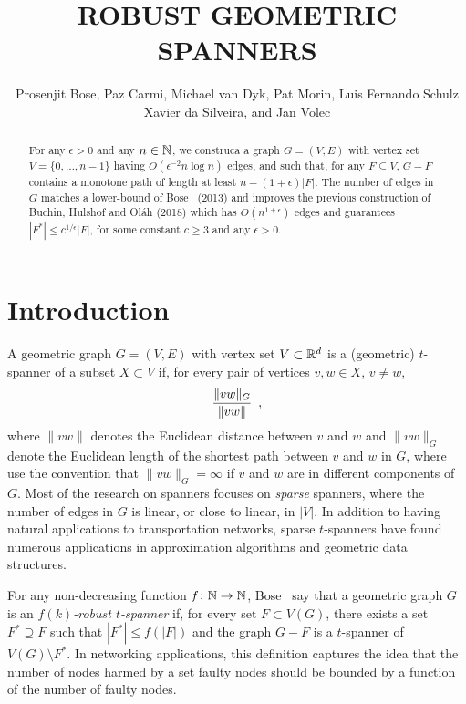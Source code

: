 \documentclass{patmorin}
\title{\MakeUppercase{Robust Geometric Spanners}}
\author{Prosenjit Bose, Paz Carmi, Michael van Dyk, Pat Morin, 
  \newline
  Luis Fernando Schulz Xavier da Silveira,
  and Jan Volec}
\begin{document}
\maketitle


\begin{abstract}
  For any $\epsilon >0$ and any $n\in\mathbb{N}$, we construca a graph $G=(V,E)$
  with vertex set $V=\{0,\ldots,n-1\}$ having $O(\epsilon^{-2}n\log n)$
  edges, and such that, for any $F\subseteq V$, $G-F$ contains a monotone
  path of length at least $n-(1+\epsilon)|F|$.  The number of edges
  in $G$ matches a lower-bound of Bose \etal\ (2013) and improves the
  previous construction of Buchin, Hulshof and Ol\'ah (2018) which has
  $O(n^{1+\epsilon})$ edges and guarantees $|F^*|\le c^{1/\epsilon}|F|$,
  for some constant $c\ge 3$ and any $\epsilon >0$.
\end{abstract}

\section{Introduction}

A geometric graph $G=(V,E)$ with vertex set $V\subset\mathbb{R}^d$ is a (geometric)
$t$-spanner of a subset $X\subset V$ if, for every pair of vertices
$v,w\in X$, $v\neq w$,
\begin{equation}
	\frac{\|vw\|_G}{\|vw\|} \enspace , \eqlabel{spanning-ratio}
\end{equation}
where $\|vw\|$ denotes the Euclidean distance between $v$ and $w$ and
$\|vw\|_G$ denote the Euclidean length of the shortest path between $v$
and $w$ in $G$, where use the convention that $\|vw\|_G=\infty$ if $v$
and $w$ are in different components of $G$.  
Most of the research on spanners focuses on \emph{sparse}
spanners, where the number of edges in $G$ is linear, or close to linear,
in $|V|$.  In addition to having natural applications to transportation
networks, sparse $t$-spanners have found numerous applications in
approximation algorithms and geometric data structures.

For any non-decreasing function $f\colon\mathbb{N}\to\mathbb{N}$, Bose \etal\ say
that a geometric graph $G$ is an \emph{$f(k)$-robust $t$-spanner}
if, for every set $F\subset V(G)$, there exists a set $F^*\supseteq
F$ such that $|F^*|\le f(|F|)$ and the graph $G-F$ is a $t$-spanner
of $V(G)\setminus F^*$.  In networking applications, this definition
captures the idea that the number of nodes harmed by a set faulty nodes
should be bounded by a function of the number of faulty nodes.
\end{document}
